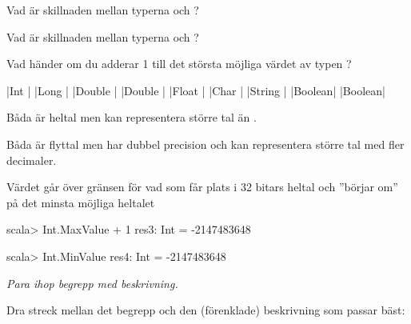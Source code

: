 \Subtask Vad är skillnaden mellan typerna  och ?

\Subtask Vad är skillnaden mellan typerna  och ?

\Subtask Vad händer om du adderar 1 till det största möjliga värdet av typen ?

\SOLUTION

\TaskSolved \what

\SubtaskSolved 

\begin{ConceptConnections}[0\textwidth]
  {\code|Int    |}
  {\code|Long   |}
  {\code|Double |}
  {\code|Double |}
  {\code|Float  |}
  {\code|Char   |}
  {\code|String |}
  {\code|Boolean|} 
  {\code|Boolean|} 
\end{ConceptConnections}

\SubtaskSolved Båda är heltal men  kan representera större tal än .


\SubtaskSolved Båda är flyttal men  har dubbel precision och kan representera större tal med fler decimaler.



\SubtaskSolved Värdet går över gränsen för vad som får plats i 32 bitars heltal och ''börjar om'' på det minsta möjliga heltalet 

\begin{REPL}
scala> Int.MaxValue + 1
res3: Int = -2147483648

scala> Int.MinValue
res4: Int = -2147483648
\end{REPL}


\QUESTEND









\def\what{\emph{Para ihop begrepp med beskrivning.}}

\QUESTBEGIN

\Task \what

\vspace{1em}\noindent Dra streck mellan det begrepp och den (förenklade) beskrivning som passar bäst:

